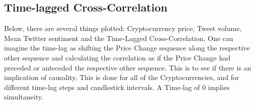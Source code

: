 \documentclass[11pt]{article}
\begin{document}
\subsection{Time-lagged Cross-Correlation}

Below, there are several things plotted: Cryptocurrency price, Tweet volume, Mean Twitter sentiment and the Time-Lagged Cross-Correlation. One can imagine the time-lag as shifting the Price Change sequence along the respective other sequence and calculating the correlation as if the Price Change had preceded or anteceded the respective other sequence. This is to see if there is an implication of causality. This is done for all of the Cryptocurrencies, and for different time-lag steps and candlestick intervals. A Time-lag of 0 implies simultaneity.\\

\end{document}
